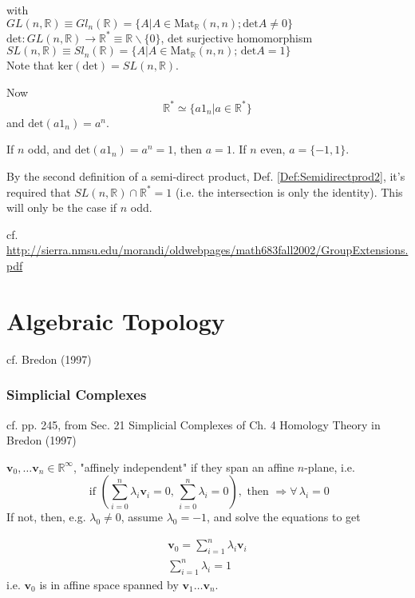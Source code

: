 \documentclass[10pt]{amsart}
\begin{document}
\begin{multicols*}{2}
\begin{itemize}
with \\
$GL(n,\mathbb{R}) \equiv Gl_n(\mathbb{R}) = \lbrace A | A \in \text{Mat}_{\mathbb{R}}(n,n); \text{det}A \neq 0\rbrace$ \\
$\text{det}:GL(n,\mathbb{R}) \to \mathbb{R}^* \equiv \mathbb{R} \backslash \lbrace 0 \rbrace $, $\text{det}$ surjective homomorphism \\
$SL(n,\mathbb{R}) \equiv Sl_n(\mathbb{R}) = \lbrace A | A \in \text{Mat}_{\mathbb{R}}(n,n); \, \text{det}A=1\rbrace$ \\

Note that $\text{ker}(\text{det}) = SL(n,\mathbb{R})$.  

Now 
\[
\mathbb{R}^* \simeq \lbrace a 1_n | a \in \mathbb{R}^* \rbrace
\]
and $\text{det}(a1_n) = a^n$.  

If $n$ odd, and $\text{det}(a1_n)=a^n =1$, then $a=1$.  If $n$ even, $a=\lbrace -1, 1 \rbrace$.  

By the second definition of a semi-direct product, Def. \ref{Def:Semidirectprod2}, it's required that $SL(n,\mathbb{R}) \cap \mathbb{R}^* = 1$ (i.e. the intersection is only the identity).  This will only be the case if $n$ odd.  

cf. \url{http://sierra.nmsu.edu/morandi/oldwebpages/math683fall2002/GroupExtensions.pdf}

\end{itemize}


\part{Algebraic Topology}  

cf. Bredon (1997) \cite{Bred1997}


\section{Simplicial Complexes}  

cf. pp. 245, from Sec. 21 Simplicial Complexes of Ch. 4 Homology Theory in Bredon (1997) \cite{Bred1997}

$\mathbf{v}_0, \dots \mathbf{v}_n \in \mathbb{R}^{\infty}$, "affinely independent" if they span an affine $n$-plane, i.e. 
\[
\text{ if } \left( \sum_{i=0}^n \lambda_i \mathbf{v}_i =0 , \, \sum_{i=0}^n \lambda_i = 0 \right), \text{ then } \Longrightarrow \forall \, \lambda_i = 0
\]
If not, then, e.g. $\lambda_0 \neq 0$, assume $\lambda_0 =-1$, and solve the equations to get 

\[
\begin{gathered}
\mathbf{v}_0 = \sum_{i=1}^n \lambda_i \mathbf{v}_i \\
\sum_{i=1}^n \lambda_i = 1
\end{gathered}
\]
i.e. $\mathbf{v}_0$ is in affine space spanned by $\mathbf{v}_1\dots \mathbf{v}_n$.  


\end{multicols*}
\end{document}
